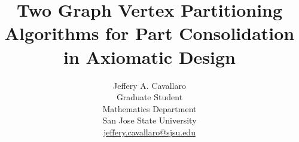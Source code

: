 \documentclass[letterpaper,12pt,fleqn]{article}
\begin{document}
\title{Two Graph Vertex Partitioning Algorithms for Part Consolidation in Axiomatic Design}
\author{Jeffery A. Cavallaro\\
  Graduate Student\\
  Mathematics Department\\
  San Jose State University\\
  \url{jeffery.cavallaro@sjsu.edu}}

\maketitle





\end{document}
